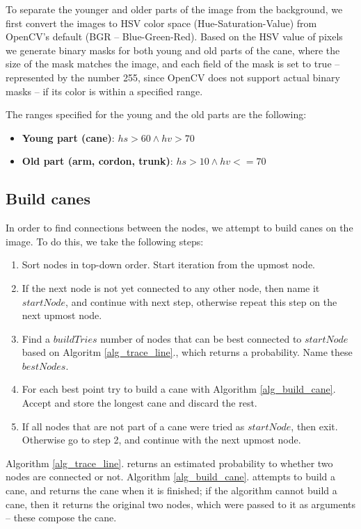 \documentclass{PSAIE}%
\begin{document}
To separate the younger and older parts of the image from the background, we first convert the images
to HSV color space (Hue-Saturation-Value) from OpenCV's default (BGR -- Blue-Green-Red). Based on the
HSV value of pixels we generate binary masks for both young and old parts of the cane, where the size
of the mask matches the image, and each field of the mask is set to true -- represented by the number 255,
since OpenCV does not support actual binary masks -- if its color is within a specified range.

The ranges specified for the young and the old parts are the following:

\begin{itemize}
      \item \textbf{Young part (cane)}: $hs > 60 \wedge hv > 70$
      \item \textbf{Old part (arm, cordon, trunk)}: $hs > 10 \wedge hv <= 70$
\end{itemize}

\subsection{Build canes} \label{sec_build_canes}
In order to find connections between the nodes, we attempt to build canes on the image. To do this,
we take the following steps:
\begin{enumerate}
      \item Sort nodes in top-down order. Start iteration from the upmost node.
      \item If the next node is not yet connected to any other node, then name it $startNode$, and continue
            with next step, otherwise repeat this step on the next upmost node.
      \item Find a $buildTries$ number of nodes that can be best connected to $startNode$ based on Algoritm
            \ref{alg_trace_line}., which returns a probability. Name these $bestNodes$.
      \item For each best point try to build a cane with Algorithm \ref{alg_build_cane}.
            Accept and store the longest cane and discard the rest.
      \item If all nodes that are not part of a cane were tried as $startNode$, then exit. Otherwise go to step
            2, and continue with the next upmost node.
\end{enumerate}

Algorithm \ref{alg_trace_line}. returns an estimated probability to whether two nodes are connected or not.
Algorithm \ref{alg_build_cane}. attempts to build a cane, and returns the cane when it is finished; if the
algorithm cannot build a cane, then it returns the original two nodes, which were passed to it as arguments
-- these compose the cane.
\end{document}
